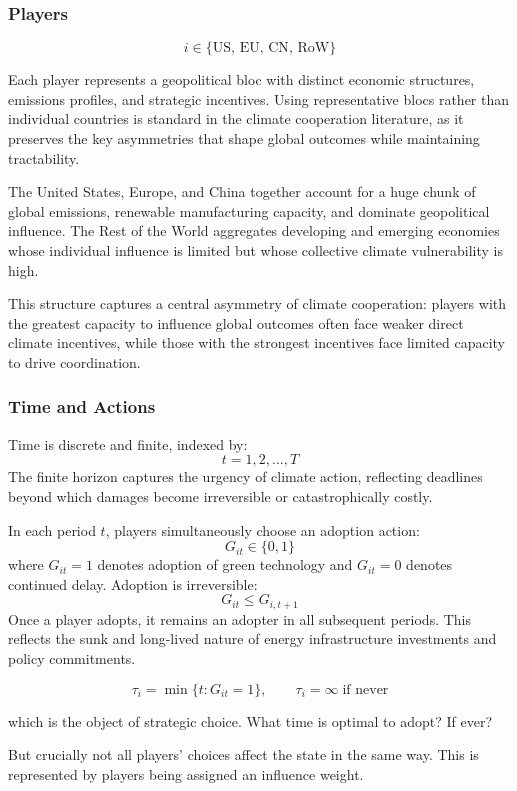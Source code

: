 \documentclass[12pt,a4paper]{article}
\begin{document}
\subsubsection{Players}

\[
  i \in \{\text{US},\, \text{EU},\, \text{CN},\, \text{RoW}\}
\]

Each player represents a geopolitical bloc with distinct economic structures, emissions profiles, and strategic incentives. Using representative blocs rather than individual countries is standard in the climate cooperation literature, as it preserves the key asymmetries that shape global outcomes while maintaining tractability.

The United States, Europe, and China together account for a huge chunk of global emissions, renewable manufacturing capacity, and dominate geopolitical influence. The Rest of the World aggregates developing and emerging economies whose individual influence is limited but whose collective climate vulnerability is high.

This structure captures a central asymmetry of climate cooperation: players with the greatest capacity to influence global outcomes often face weaker direct climate incentives, while those with the strongest incentives face limited capacity to drive coordination.

\subsubsection{Time and Actions}

Time is discrete and finite, indexed by:
\[
  t = 1, 2, \ldots, T
\]
The finite horizon captures the urgency of climate action, reflecting deadlines beyond which damages become irreversible or catastrophically costly.

In each period $t$, players simultaneously choose an adoption action:
\[
  G_{it} \in \{0, 1\}
\]
where $G_{it} = 1$ denotes adoption of green technology and $G_{it} = 0$ denotes continued delay. Adoption is irreversible:
\[
  G_{it} \leq G_{i,t+1}
\]
Once a player adopts, it remains an adopter in all subsequent periods. This reflects the sunk and long-lived nature of energy infrastructure investments and policy commitments.

\[
  \tau_i = \min\{t : G_{it} = 1\}, \qquad \tau_i = \infty \;\text{if never}
\]

which is the object of strategic choice. What time is optimal to adopt? If ever?

But crucially not all players' choices affect the state in the same way. This is represented by players being assigned an influence weight.
\end{document}
